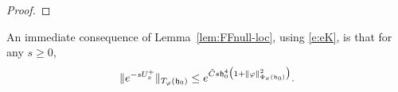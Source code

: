 \begin{proof}
\end{proof}

An immediate consequence of Lemma~\ref{lem:FFnull-loc}, using \eqref{e:eK},
is that for any $s \ge 0$,
\begin{equation}
\label{e:Itilbd}
\|e^{-s U^+_x}\|_{T_\varphi(\mathfrak{h}_0)}
	\leq
e^{\tilde C s \mathfrak{h}_0^4 \big(1 + \|\varphi\|^2_{\Phi_x(\mathfrak{h}_0)}\big)}.
\end{equation}

